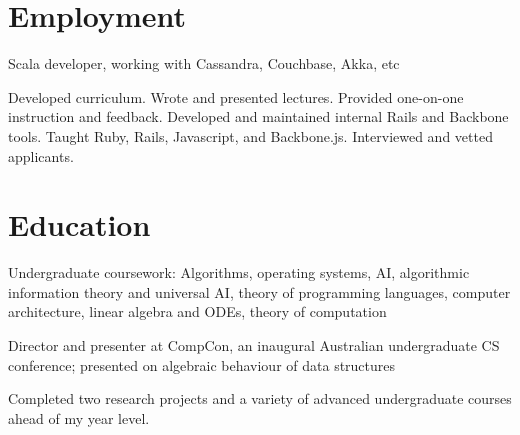 \documentclass[letterpaper]{resume}
\begin{document}
\author{Buck Shlegeris}
\maketitle

\section{Employment}

\begin{compactitem}
\item Scala developer, working with Cassandra, Couchbase, Akka, etc
\end{compactitem}



\begin{compactitem}
\item Developed curriculum. Wrote and presented lectures. Provided one-on-one instruction and feedback. Developed and maintained internal Rails and Backbone tools. Taught Ruby, Rails, Javascript, and Backbone.js. Interviewed and vetted applicants.

\end{compactitem}

\section{Education}


\begin{compactitem}
\item Undergraduate coursework: Algorithms, operating systems, AI, algorithmic information theory and universal AI, theory of programming languages, computer architecture, linear algebra and ODEs, theory of computation
\item Director and presenter at CompCon, an inaugural Australian undergraduate CS conference; presented on algebraic behaviour of data structures
\item Completed two research projects and a variety of advanced undergraduate courses ahead of my year level.
\end{compactitem}
\end{document}
